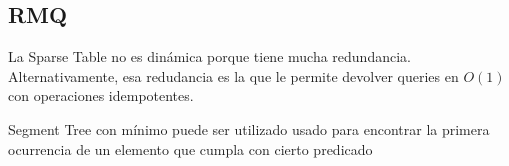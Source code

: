 \subsection{RMQ}

La Sparse Table no es dinámica porque tiene mucha redundancia. Alternativamente, esa redudancia es la que le permite devolver queries en $O(1)$ con operaciones idempotentes.


Segment Tree con mínimo puede ser utilizado usado para encontrar la primera ocurrencia de un elemento que cumpla con cierto predicado
